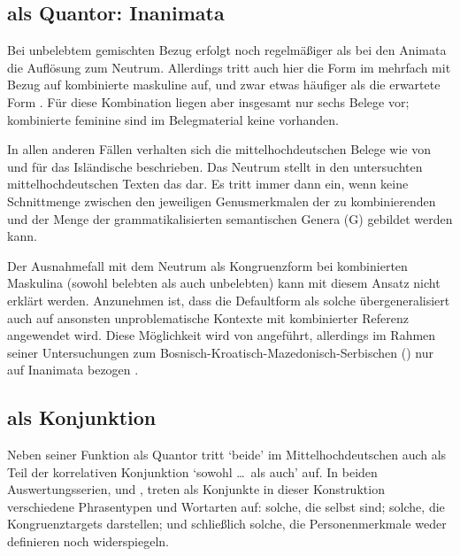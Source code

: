 \subsection{ als Quantor: Inanimata}

Bei unbelebtem gemischten Bezug erfolgt noch regelmäßiger als bei den
Animata die Auflösung zum Neutrum. Allerdings
tritt auch hier die Form  im \CAO{} mehrfach mit Bezug auf
kombinierte maskuline  auf, und zwar etwas häufiger als die
erwartete Form . Für diese Kombination liegen aber insgesamt nur
sechs Belege vor; kombinierte feminine  sind im Belegmaterial
keine vorhanden.

In allen anderen Fällen verhalten sich die
mittelhochdeutschen Belege wie von
\citet{wechslerzlatic2003} und \citet{wechsler2009} für das
Isländische beschrieben. Das Neutrum stellt in den untersuchten
mittelhochdeutschen Texten das  dar. Es
tritt immer dann ein, wenn keine Schnittmenge zwischen den jeweiligen
Genusmerkmalen der zu kombinierenden  und der
Menge der grammatikalisierten semantischen Genera (G)
gebildet werden kann.

Der Ausnahmefall mit dem Neutrum als Kongruenzform bei
kombinierten Maskulina (sowohl belebten als auch unbelebten) kann
mit diesem Ansatz nicht erklärt werden. Anzunehmen ist, dass die
Defaultform als solche übergeneralisiert auch
auf ansonsten unproblematische Kontexte mit kombinierter Referenz angewendet
wird. Diese Möglichkeit wird von \citet[302]{corbett1991} angeführt, allerdings
im Rahmen seiner Untersuchungen zum
Bosnisch-\allowbreak{}Kroatisch-\allowbreak{}Mazedonisch-\allowbreak{}Serbischen
() nur auf Inanimata bezogen
\autocites[vgl.~auch][190]{wechslerzlatic2003}[581]{wechsler2009}.


\subsection{ als Konjunktion}

Neben seiner Funktion als Quantor tritt `beide' im
Mittelhochdeutschen auch als Teil der korrelativen
Konjunktion  `sowohl \dots\ als auch' auf. In beiden
Auswertungs\-serien, \CAO{} und \KC{}, treten als Konjunkte in dieser
Konstruktion verschiedene Phrasen\-typen und Wort\-arten auf: solche, die
selbst  sind; solche, die Kongruenztargets
darstellen; und schließlich solche, die Personenmerkmale
weder definieren noch widerspiegeln.


